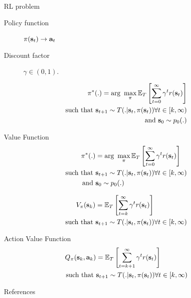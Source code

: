 \documentclass[notes]{beamer} %
\begin{document}
\begin{frame}{RL problem}
  \begin{description}
      \item[Policy function] 
        $\pi(\mathbf{s}_t) \to \mathbf{a}_t$\\
      \item[Discount factor ] $\gamma \in (0,1)$.
  \end{description}
  \begin{align*}
    \pi^*(.) = \arg~\max_{\pi} \mathbb{E}_{T}\left[\sum_{t=0}^{\infty}
      \gamma^{t} r(\mathbf{s}_t) \right]
    \\
    \text{such that } \mathbf{s}_{t+1}\sim T(.|\mathbf{s}_t, \pi(\mathbf{s}_t))\forall t \in [k, \infty) \\
    \text{ and } \mathbf{s}_0 \sim p_0(.) 
  \end{align*}
\end{frame}

\begin{frame}{Value Function}
  \begin{align*}
    \pi^*(.) &= \arg~\max_{\pi} \mathbb{E}_{T}\left[\sum_{t=0}^{\infty}
    \gamma^{t} r(\mathbf{s}_t) \right]
    \\
    \text{such that }& \mathbf{s}_{t+1}\sim T(.|\mathbf{s}_t, \pi(\mathbf{s}_t)) \forall t \in [k, \infty)\\
    \text{ and }& \mathbf{s}_0 \sim p_0(.) 
  \end{align*}

  \begin{align*}
    V_\pi(\mathbf{s}_k) &= \mathbb{E}_{T}\left[\sum_{t=k}^{\infty}
    \gamma^{t} r(\mathbf{s}_t) \right]
    \\
    \text{such that }& \mathbf{s}_{t+1}\sim T(.|\mathbf{s}_t, \pi(\mathbf{s}_t)) \forall t \in [k, \infty)\\
  \end{align*}
\end{frame}

\begin{frame}{Action Value Function}
  \begin{align*}
    Q_\pi(\mathbf{s}_k, \mathbf{a}_k) &= \mathbb{E}_{T}\left[\sum_{t=k+1}^{\infty}
                    \gamma^{t} r(\mathbf{s}_t) \right]
    \\
    \text{such that }& \mathbf{s}_{t+1}\sim T(.|\mathbf{s}_t, \pi(\mathbf{s}_t)) \forall t \in [k, \infty) \\
  \end{align*}
\end{frame}


\begin{frame}{References}


\end{frame}
\end{document}
